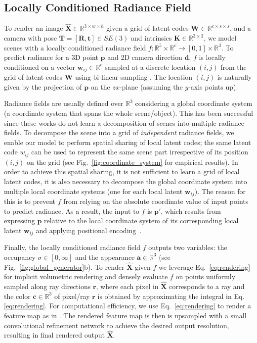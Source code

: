 \documentclass[10pt,twocolumn,letterpaper]{article}
\begin{document}
\subsection{Locally Conditioned Radiance Field}\label{sec:local_radiance_fields}

To render an image $\hat{\textbf{X}} \in \mathbb{R}^{3 \times w \times h}$ given a grid of latent codes $\textbf{W} \in \mathbb{R}^{c \times s \times s}$, and a camera with pose $\textbf{T}=[\textbf{R}, \textbf{t}] \in SE(3)$ and intrinsics $\textbf{K} \in \mathbb{R}^{3 \times 3}$,  we model scenes with a locally conditioned radiance field \cite{nerf} $f:\mathbb{R}^5 \times \mathbb{R}^c \rightarrow [0, 1] \times \mathbb{R}^3$. To predict radiance for a 3D point $\textbf{p}$ and 2D camera direction $\textbf{d}$, $f$ is locally conditioned on a vector $\textbf{w}_{ij} \in \mathbb{R}^c$ sampled at a discrete location $(i, j)$ from the grid of latent codes $\textbf{W}$ using bi-linear sampling \cite{stn}. The location $(i, j)$ is naturally given by the projection of $\textbf{p}$ on the $zx$-plane (assuming the $y$-axis points up). 


Radiance fields are usually defined over $\mathbb{R}^3$ considering a global coordinate system \cite{nerf,graf,pigan} (\ie a coordinate system that spans the whole scene/object). This has been successful since these works do not learn a decomposition of scenes into multiple radiance fields. To decompose the scene into a grid of \textit{independent} radiance fields, we enable our model to perform spatial sharing of local latent codes; the same latent code $w_{ij}$ can be used to represent the same scene part irrespective of its position $(i, j)$ on the grid (see Fig.~\ref{fig:coordinate_system} for empirical results). In order to achieve this spatial sharing, it is not sufficient to learn a grid of local latent codes, it is also necessary to decompose the global coordinate system into multiple local coordinate systems (one for each local latent $\textbf{w}_{ij}$). The reason for this is to prevent $f$ from relying on the absolute coordinate value of input points to predict radiance. As a result, the input to $f$ is  $\textbf{p}'$, which results from expressing $\textbf{p}$ relative to the local coordinate system of its corresponding local latent $\textbf{w}_{ij}$ and applying positional encoding~\cite{nerf}.

Finally, the locally conditioned radiance field $f$ outputs two variables: the occupancy $\sigma \in [0, \infty]$ and the appearance $\textbf{a} \in \mathbb{R}^3$ (see Fig.~\ref{fig:global_generator}b). To render $\hat{\textbf{X}}$ given $f$ we leverage Eq.~\ref{eq:rendering} for implicit volumetric rendering \cite{nerf} and densely evaluate $f$ on points uniformly sampled along ray directions $\textbf{r}$, where each pixel in $\hat{\textbf{X}}$ corresponds to a ray and the color $\textbf{c} \in \mathbb{R}^3$ of pixel/ray $\textbf{r}$ is obtained by approximating the integral in Eq. \ref{eq:rendering}. For computational efficiency, we use Eq.~\ref{eq:rendering}  to render a feature map as in \cite{giraffe}. The rendered feature map is then is upsampled with a small convolutional refinement network to achieve the desired output resolution, resulting in final rendered output $\hat{\textbf{X}}$.
\end{document}
